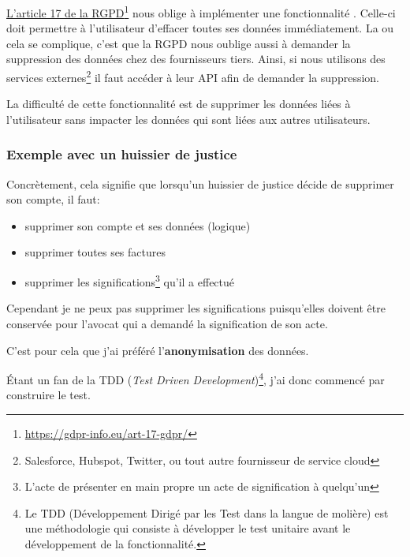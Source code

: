 \documentclass[]{report}
\newcommand\fnurl[2]{%
  \href{#1}{#2}\footnote{\url{#1}}%
}
\begin{document}
      \fnurl{https://gdpr-info.eu/art-17-gdpr/}{L'article 17 de la RGPD} nous oblige à implémenter une fonctionnalité . Celle-ci doit permettre à l'utilisateur d'effacer toutes ses données immédiatement. La ou cela se complique, c'est que la RGPD nous oublige aussi à demander la suppression des données chez des fournisseurs tiers. Ainsi, si nous utilisons des services externes\footnote{Salesforce, Hubspot, Twitter, ou tout autre fournisseur de service cloud} il faut accéder à leur API afin de demander la suppression.

      La difficulté de cette fonctionnalité est de supprimer les données liées à l'utilisateur sans impacter les données qui sont liées aux autres utilisateurs.

      \subsubsection{Exemple avec un huissier de justice}

        Concrètement, cela signifie que lorsqu'un huissier de justice décide de supprimer son compte, il faut:

        \begin{itemize}
          \item supprimer son compte et ses données (logique)
          \item supprimer toutes ses factures
          \item supprimer les significations\footnote{L'acte de présenter en main propre un acte de signification à quelqu'un} qu'il a effectué
        \end{itemize}

        Cependant je ne peux pas supprimer les significations puisqu'elles doivent être conservée pour l'avocat qui a demandé la signification de son acte.

        C'est pour cela que j'ai préféré l'\textbf{anonymisation} des données.

        Étant un fan de la TDD (\textit{Test Driven Development})\footnote{Le TDD (Développement Dirigé par les Test dans la langue de molière) est une méthodologie qui consiste à développer le test unitaire avant le développement de la fonctionnalité.}, j'ai donc commencé par construire le test.
\end{document}
